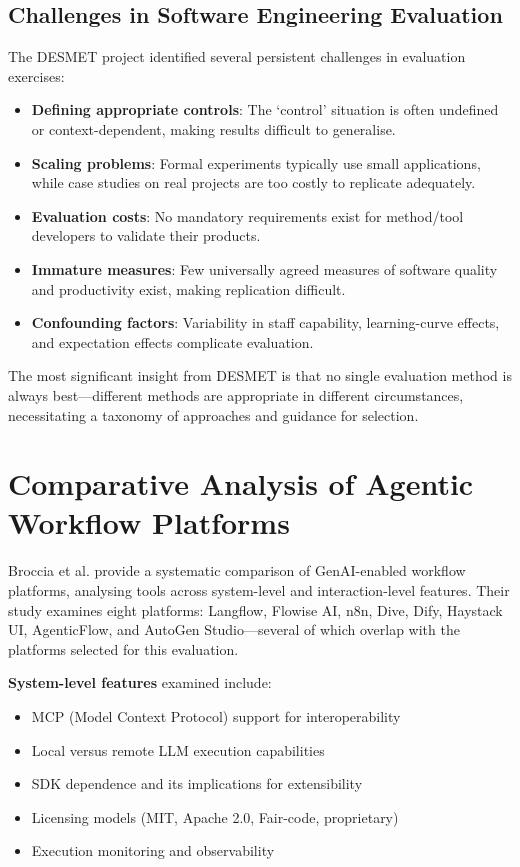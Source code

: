 \documentclass[]
{UCD_CS_FYP_Report}
\begin{document}
\subsection{Challenges in Software Engineering Evaluation}

The DESMET project identified several persistent challenges in evaluation exercises:

\begin{itemize}
  \item \textbf{Defining appropriate controls}: The `control' situation is often undefined or context-dependent, making results difficult to generalise.
  \item \textbf{Scaling problems}: Formal experiments typically use small applications, while case studies on real projects are too costly to replicate adequately.
  \item \textbf{Evaluation costs}: No mandatory requirements exist for method/tool developers to validate their products.
  \item \textbf{Immature measures}: Few universally agreed measures of software quality and productivity exist, making replication difficult.
  \item \textbf{Confounding factors}: Variability in staff capability, learning-curve effects, and expectation effects complicate evaluation.
\end{itemize}

The most significant insight from DESMET is that no single evaluation method is always best---different methods are appropriate in different circumstances, necessitating a taxonomy of approaches and guidance for selection.

\section{Comparative Analysis of Agentic Workflow Platforms}

Broccia et al. \cite{broccia2025humainflow} provide a systematic comparison of GenAI-enabled workflow platforms, analysing tools across system-level and interaction-level features. Their study examines eight platforms: Langflow, Flowise AI, n8n, Dive, Dify, Haystack UI, AgenticFlow, and AutoGen Studio---several of which overlap with the platforms selected for this evaluation.

\textbf{System-level features} examined include:
\begin{itemize}
  \item MCP (Model Context Protocol) support for interoperability
  \item Local versus remote LLM execution capabilities
  \item SDK dependence and its implications for extensibility
  \item Licensing models (MIT, Apache 2.0, Fair-code, proprietary)
  \item Execution monitoring and observability
\end{itemize}
\end{document}
